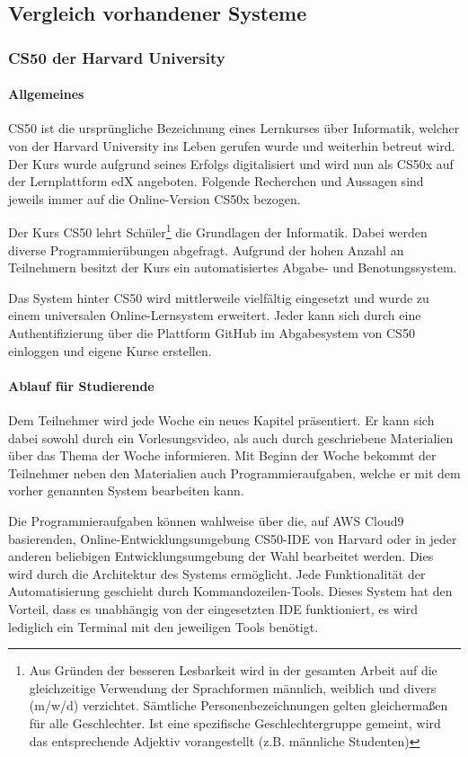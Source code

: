 \subsection{Vergleich vorhandener Systeme}
\subsubsection{CS50 der Harvard University}
\paragraph{Allgemeines}
CS50 ist die ursprüngliche Bezeichnung eines Lernkurses über Informatik,
welcher von der Harvard University ins Leben gerufen wurde und weiterhin
betreut wird. Der Kurs wurde aufgrund seines Erfolgs digitalisiert und wird nun
als CS50x auf der Lernplattform edX angeboten. Folgende Recherchen und Aussagen
sind jeweils immer auf die Online-Version CS50x bezogen.

Der Kurs CS50 lehrt Schüler\footnote{Aus Gründen der besseren Lesbarkeit wird
in der gesamten Arbeit auf die gleichzeitige Verwendung der Sprachformen
männlich, weiblich und divers (m/w/d) verzichtet. Sämtliche
Personenbezeichnungen gelten gleichermaßen für alle Geschlechter. Ist eine
spezifische Geschlechtergruppe gemeint, wird das entsprechende Adjektiv
vorangestellt (z.B. \glqq männliche Studenten\grqq)} die Grundlagen der
Informatik. Dabei werden diverse Programmierübungen abgefragt. Aufgrund der
hohen Anzahl an Teilnehmern besitzt der Kurs ein automatisiertes Abgabe- und Benotungssystem.

Das System hinter CS50 wird mittlerweile vielfältig eingesetzt und wurde zu
einem universalen Online-Lernsystem erweitert. Jeder kann sich durch eine
Authentifizierung über die Plattform GitHub im Abgabesystem von CS50 einloggen
und eigene Kurse erstellen. \parencite{cs50}

\newpage
\paragraph{Ablauf für Studierende}
Dem Teilnehmer wird jede Woche ein neues Kapitel präsentiert. Er kann sich dabei
sowohl durch ein Vorlesungsvideo, als auch durch geschriebene Materialien über
das Thema der Woche informieren. Mit Beginn der Woche bekommt der Teilnehmer
neben den Materialien auch Programmieraufgaben, welche er mit dem vorher
genannten System bearbeiten kann. \parencite{cs50-edx}

Die Programmieraufgaben können wahlweise über die, auf AWS Cloud9 basierenden,
Online-Entwicklungsumgebung \glqq CS50-IDE\grqq{} von Harvard oder in jeder
anderen beliebigen Entwicklungsumgebung der Wahl bearbeitet werden. Dies
wird durch die Architektur des Systems ermöglicht. Jede Funktionalität der
Automatisierung geschieht durch Kommandozeilen-Tools. Dieses System hat den
Vorteil, dass es unabhängig von der eingesetzten IDE funktioniert, es wird
lediglich ein Terminal mit den jeweiligen Tools benötigt. \parencite{cs50-ide}

